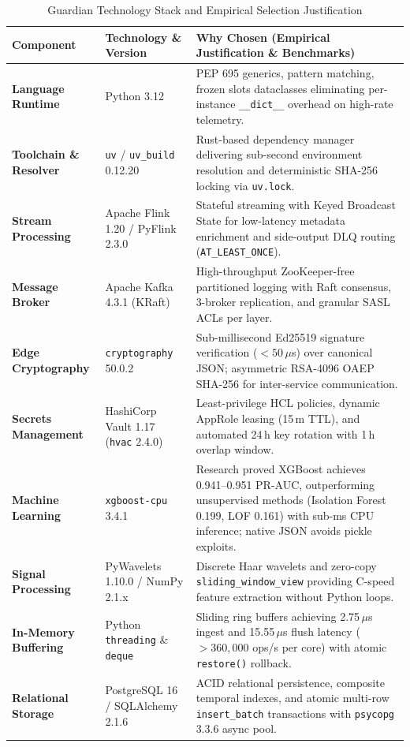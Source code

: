 \documentclass[11pt,a4paper]{article}
\begin{document}
\begin{table}[H]
\centering
\scriptsize
\caption{Guardian Technology Stack and Empirical Selection Justification}
\label{tab:tech_stack}
\begin{tabularx}{\textwidth}{llX}
\toprule
\textbf{Component} & \textbf{Technology \& Version} & \textbf{Why Chosen (Empirical Justification \& Benchmarks)} \\
\midrule
\textbf{Language Runtime} & Python 3.12 & PEP 695 generics, pattern matching, frozen slots dataclasses eliminating per-instance \texttt{\_\_dict\_\_} overhead on high-rate telemetry. \\
\textbf{Toolchain \& Resolver} & \texttt{uv} / \texttt{uv\_build} 0.12.20 & Rust-based dependency manager delivering sub-second environment resolution and deterministic SHA-256 locking via \texttt{uv.lock}. \\
\textbf{Stream Processing} & Apache Flink 1.20 / PyFlink 2.3.0 & Stateful streaming with Keyed Broadcast State for low-latency metadata enrichment and side-output DLQ routing (\texttt{AT\_LEAST\_ONCE}). \\
\textbf{Message Broker} & Apache Kafka 4.3.1 (KRaft) & High-throughput ZooKeeper-free partitioned logging with Raft consensus, 3-broker replication, and granular SASL ACLs per layer. \\
\textbf{Edge Cryptography} & \texttt{cryptography} 50.0.2 & Sub-millisecond Ed25519 signature verification ($<50\,\mu$s) over canonical JSON; asymmetric RSA-4096 OAEP SHA-256 for inter-service communication. \\
\textbf{Secrets Management} & HashiCorp Vault 1.17 (\texttt{hvac} 2.4.0) & Least-privilege HCL policies, dynamic AppRole leasing (15\,m TTL), and automated 24\,h key rotation with 1\,h overlap window. \\
\textbf{Machine Learning} & \texttt{xgboost-cpu} 3.4.1 & Research proved XGBoost achieves 0.941--0.951 PR-AUC, outperforming unsupervised methods (Isolation Forest 0.199, LOF 0.161) with sub-ms CPU inference; native JSON avoids pickle exploits. \\
\textbf{Signal Processing} & PyWavelets 1.10.0 / NumPy 2.1.x & Discrete Haar wavelets and zero-copy \texttt{sliding\_window\_view} providing C-speed feature extraction without Python loops. \\
\textbf{In-Memory Buffering} & Python \texttt{threading} \& \texttt{deque} & Sliding ring buffers achieving 2.75\,$\mu$s ingest and 15.55\,$\mu$s flush latency ($>360,000$ ops/s per core) with atomic \texttt{restore()} rollback. \\
\textbf{Relational Storage} & PostgreSQL 16 / SQLAlchemy 2.1.6 & ACID relational persistence, composite temporal indexes, and atomic multi-row \texttt{insert\_batch} transactions with \texttt{psycopg} 3.3.6 async pool. \\
\bottomrule
\end{tabularx}
\end{table}
\end{document}
